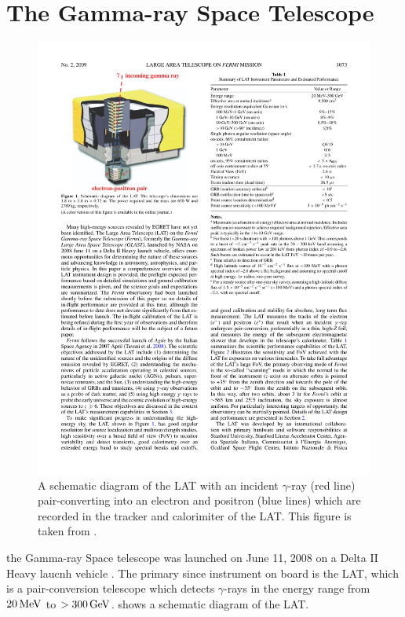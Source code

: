 \section{The \fermi Gamma-ray Space Telescope}

\begin{figure}[htbp]
  \centering
    \includegraphics{chapters/introduction/figures/lat_detector_cutout.pdf}
  \caption{A schematic diagram of the \ac{LAT} with an incident $\gamma$-ray
    (red line) pair-converting into an electron and positron (blue lines)
    which are recorded in the tracker and calorimiter of the \ac{LAT}.
    This figure is taken from \citep{atwood_2009a_large-telescope}.  
  }
\end{figure} 


the \fermi Gamma-ray Space telescope was launched on June 11, 2008 on
a Delta II Heavy laucnh vehicle \citep{atwood_2009a_large-telescope}.
The primary since instrument on board \fermi is the \ac{LAT},
which is a pair-conversion telescope which detects $\gamma$-rays in
the energy range from $20\,\text{MeV}$ to $>300\,\text{GeV}$.
 shows a schematic diagram of the \ac{LAT}.


